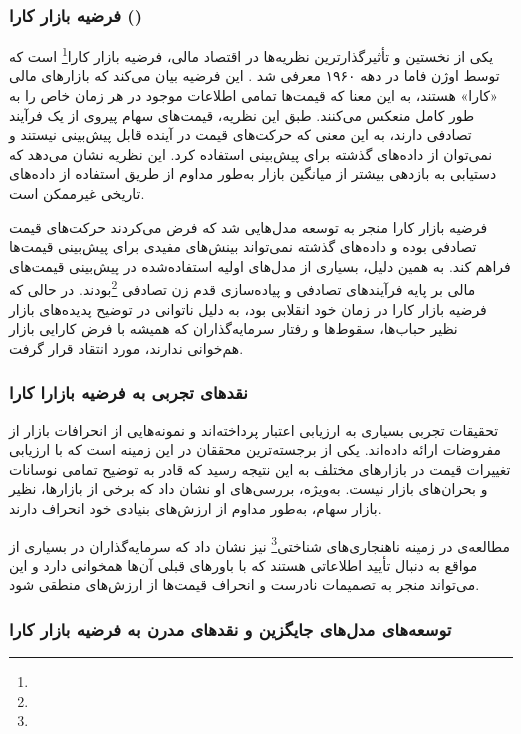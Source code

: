 \subsubsection{فرضیه بازار کارا ()}
یکی از نخستین و تأثیرگذارترین نظریه‌ها در اقتصاد مالی، فرضیه بازار کارا\footnote{} است که توسط اوژن فاما در دهه ۱۹۶۰ معرفی شد \cite{fama1965efficient}. این فرضیه بیان می‌کند که بازارهای مالی «کارا» هستند، به این معنا که قیمت‌ها تمامی اطلاعات موجود در هر زمان خاص را به طور کامل منعکس می‌کنند. طبق این نظریه، قیمت‌های سهام پیروی از یک فرآیند تصادفی دارند، به این معنی که حرکت‌های قیمت در آینده قابل پیش‌بینی نیستند و نمی‌توان از داده‌های گذشته برای پیش‌بینی استفاده کرد. این نظریه نشان می‌دهد که دستیابی به بازدهی بیشتر از میانگین بازار به‌طور مداوم از طریق استفاده از داده‌های تاریخی غیرممکن است.


فرضیه بازار کارا منجر به توسعه مدل‌هایی شد که فرض می‌کردند حرکت‌های قیمت تصادفی بوده و داده‌های گذشته نمی‌تواند بینش‌های مفیدی برای پیش‌بینی قیمت‌ها فراهم کند. به همین دلیل، بسیاری از مدل‌های اولیه استفاده‌شده در پیش‌بینی قیمت‌های مالی بر پایه فرآیندهای تصادفی و پیاده‌سازی قدم زن تصادفی \footnote{}بودند. در حالی که فرضیه بازار کارا در زمان خود انقلابی بود، به دلیل ناتوانی در توضیح پدیده‌های بازار نظیر حباب‌ها، سقوط‌ها و رفتار سرمایه‌گذاران که همیشه با فرض کارایی بازار هم‌خوانی ندارند، مورد انتقاد قرار گرفت.


\subsubsection{نقدهای تجربی به فرضیه بازارا کارا}
تحقیقات تجربی بسیاری به ارزیابی اعتبار  پرداخته‌اند و نمونه‌هایی از انحرافات بازار از مفروضات  ارائه داده‌اند. \cite{lo1997market} یکی از برجسته‌ترین محققان در این زمینه است که با ارزیابی تغییرات قیمت در بازارهای مختلف به این نتیجه رسید که  قادر به توضیح تمامی نوسانات و بحران‌های بازار نیست. به‌ویژه، بررسی‌های او نشان داد که برخی از بازارها، نظیر بازار سهام، به‌طور مداوم از ارزش‌های بنیادی خود انحراف دارند.

مطالعه‌ی \cite{festinger1957theory} در زمینه ناهنجاری‌های شناختی\footnote{} نیز نشان داد که سرمایه‌گذاران در بسیاری از مواقع به دنبال تأیید اطلاعاتی هستند که با باورهای قبلی آن‌ها همخوانی دارد و این می‌تواند منجر به تصمیمات نادرست و انحراف قیمت‌ها از ارزش‌های منطقی شود.

\subsubsection{توسعه‌های مدل‌های جایگزین و نقدهای مدرن به فرضیه بازار کارا }

